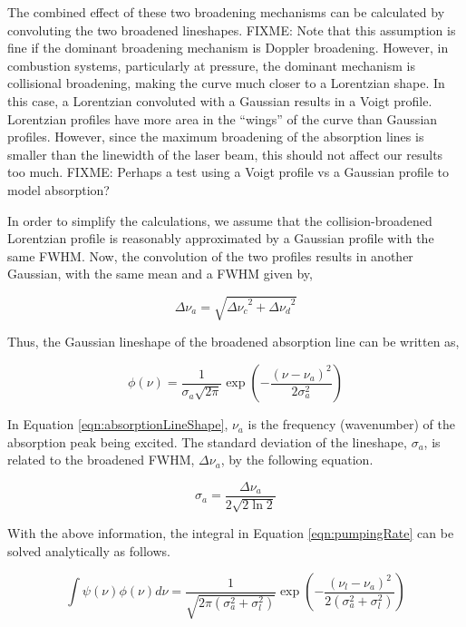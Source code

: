 The combined effect of these two broadening mechanisms can be calculated by convoluting the two broadened lineshapes.
FIXME: Note that this assumption is fine if the dominant broadening mechanism is Doppler broadening.
However, in combustion systems, particularly at pressure, the dominant mechanism is collisional broadening, making the curve much closer to a Lorentzian shape.
In this case, a Lorentzian convoluted with a Gaussian results in a Voigt profile.
Lorentzian profiles have more area in the ``wings'' of the curve than Gaussian profiles.
However, since the maximum broadening of the absorption lines is smaller than the linewidth of the laser beam, this should not affect our results too much.
FIXME: Perhaps a test using a Voigt profile vs a Gaussian profile to model absorption?

In order to simplify the calculations, we assume that the collision-broadened Lorentzian profile is reasonably approximated by a Gaussian profile with the same FWHM.
Now, the convolution of the two profiles results in another Gaussian, with the same mean and a FWHM given by,

\begin{equation}
  \Delta\nu_a = \sqrt{ { \Delta\nu_c }^2 + { \Delta\nu_d }^2 }
  \label{eqn:broadening}
\end{equation}

Thus, the Gaussian lineshape of the broadened absorption line can be written as,

\begin{equation}
  \phi(\nu) = \frac{1}{\sigma_a\sqrt{2\pi}} \exp{\left(-\dfrac{(\nu-\nu_a)^2}{2\sigma_a^2}\right)}
  \label{eqn:absorptionLineShape}
\end{equation}

In Equation \ref{eqn:absorptionLineShape}, \(\nu_a\) is the frequency (wavenumber) of the absorption peak being excited.
The standard deviation of the lineshape, \(\sigma_a\), is related to the broadened FWHM, \(\Delta\nu_a\), by the following equation.

\begin{equation}
  \sigma_a = \frac{\Delta\nu_a}{2 \sqrt{ 2 \ln{2} } }
\end{equation}

With the above information, the integral in Equation \ref{eqn:pumpingRate} can be solved analytically as follows.

\begin{equation}
  \int \psi(\nu) \phi(\nu) d\nu = \frac{1}{\sqrt{2\pi ( \sigma_a^2 + \sigma_l^2 )}} \exp{\left(-\frac{ (\nu_l - \nu_a )^2 }{2 ( \sigma_a^2 + \sigma_l^2 )}\right)}
  \label{eqn:absorptionIntegral}
\end{equation}



